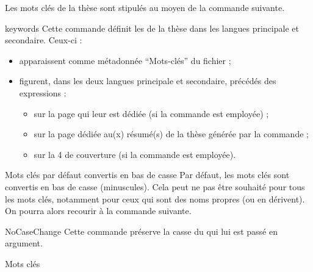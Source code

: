 Les mots clés de la thèse sont stipulés au moyen de la commande
 suivante.
%
\begin{docCommand}[doc description=\mandatory]{keywords}{}
  Cette commande définit les  de la thèse dans
  les langues principale et secondaire. Ceux-ci :
  \begin{itemize}
  \item apparaissent comme métadonnée \enquote{Mots-clés} du fichier \pdf{} ;
  \item figurent, dans les deux langues principale et secondaire, précédés des
    expressions  :
    \begin{itemize}
    \item sur la page qui leur est dédiée (si la commande 
      est employée) ;
    \item sur la page dédiée au(x) résumé(s) de la thèse générée par la
      commande  ;
    \item sur la 4\ieme{} de couverture (si la commande 
      est employée).
    \end{itemize}
  \end{itemize}
\end{docCommand}
%
\begin{dbwarning}{Mots clés par défaut convertis en bas de casse}{}
  Par défaut, les mots clés sont convertis en bas de casse (minuscules). Cela
  peut ne pas être souhaité pour tous les mots clés, notamment pour ceux qui
  sont des noms propres (ou en dérivent). On pourra alors recourir à la commande
   suivante.
\end{dbwarning}
%
\begin{docCommand}{NoCaseChange}{}
  Cette commande préserve la \gls{casse} du  qui lui est passé
  en argument.
\end{docCommand}

\begin{dbexample}{Mots clés}{}
\begin{preamblecode}[listing options={deletekeywords={[5]keywords}}]
\end{preamblecode}
\end{dbexample}

